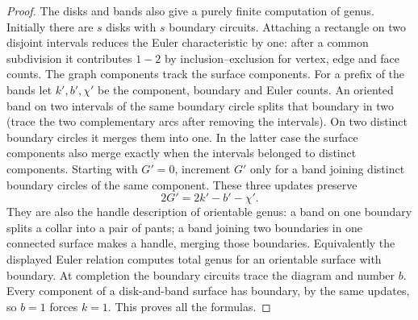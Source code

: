 \begin{proof}
The disks and bands also give a purely finite computation of genus.
Initially there are $s$ disks with $s$ boundary circuits. Attaching a
rectangle on two disjoint intervals reduces the Euler characteristic
by one: after a common subdivision it contributes $1-2$ by
inclusion--exclusion for vertex, edge and face counts. The graph
components track the surface components. For a prefix of the bands let
$k',b',\chi'$ be the component, boundary and Euler counts. An oriented
band on two intervals of the same boundary circle splits that boundary
in two (trace the two complementary arcs after removing the intervals).
On two distinct boundary circles it merges them into one. In the latter
case the surface components also merge exactly when the intervals
belonged to distinct components. Starting with $G'=0$, increment $G'$
only for a band joining distinct boundary circles of the same component.
These three updates preserve
\[
                      2G'=2k'-b'-\chi'.
\]
They are also the handle description of orientable genus: a band on
one boundary splits a collar into a pair of pants; a band joining two
boundaries in one connected surface makes a handle, merging those
boundaries. Equivalently the displayed Euler relation computes total
genus for an orientable surface with boundary. At completion the
boundary circuits trace the diagram and number $b$. Every component of
a disk-and-band surface has boundary, by the same updates, so $b=1$
forces $k=1$. This proves all the formulas.
\end{proof}

